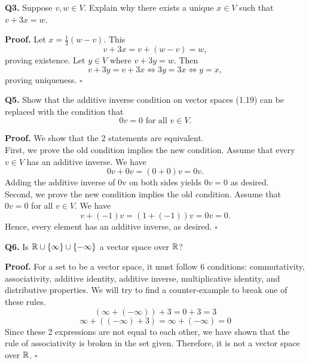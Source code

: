 \documentclass[12pt, letterpaper]{article}
\begin{document}
\textbf{Q3.}
Suppose $v,w\in V$. Explain why there exists a unique $x\in V$ such that $v+3x=w$.

\textbf{Proof.}
Let $x=\frac{1}{3}(w-v)$. This
$$v+3x=v+(w-v)=w,$$
proving existence.
Let $y\in V$ where $v+3y=w$. Then
$$v+3y=v+3x\iff 3y=3x\iff y=x,$$
proving uniqueness. $\square$

\textbf{Q5.}
Show that the additive inverse condition on vector spaces (1.19) 
can be replaced with the condition that
$$0v=0 \text{ for all } v\in V.$$

\textbf{Proof.}
We show that the 2 statements are equivalent.\\
First, we prove the old condition implies the new condition.
Assume that every $v\in V$ has an additive inverse.
We have
$$0v+0v=(0+0)v=0v.$$
Adding the additive inverse of 0v on both sides yields
$0v=0$ as desired.\\
Second, we prove the new condition implies the old condition.
Assume that $0v=0$ for all $v\in V$.
We have
$$v+(-1)v=(1+(-1))v=0v=0.$$
Hence, every element has an additive inverse, as desired. $\square$

\textbf{Q6.}
Is $\mathbb{R}\cup\{\infty\}\cup\{-\infty\}$ a vector space over $\mathbb{R}$?

\textbf{Proof.}
For a set to be a vector space, it must follow 6 conditions:
commutativity, associativity, additive identity, additive inverse, multiplicative identity, and distributive properties.
We will try to find a counter-example to break one of these rules.
$$(\infty+(-\infty))+3=0+3=3$$
$$\infty+((-\infty)+3)=\infty+(-\infty)=0$$
Since these 2 expressions are not equal to each other, we have shown that the rule of associativity
is broken in the set given. Therefore, it is not a vector space over $\mathbb{R}$. $\square$
\end{document}
